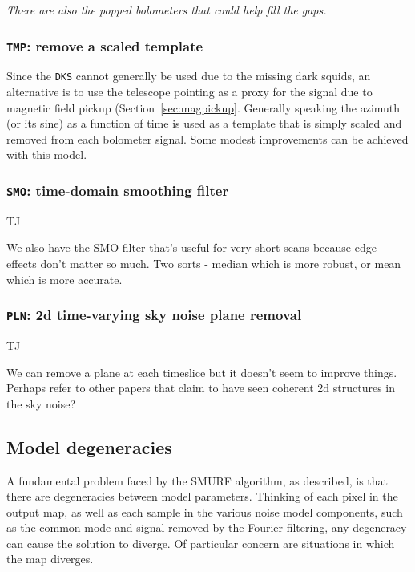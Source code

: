 \documentclass[useAMS,usenatbib,nofootinbib]{mn2e}
\begin{document}
\textit{There are also the popped bolometers that could help fill the
gaps.}

\subsubsection{\texttt{TMP}: remove a scaled template}

Since the \texttt{DKS} cannot generally be used due to the missing
dark squids, an alternative is to use the telescope pointing as a
proxy for the signal due to magnetic field pickup
(Section~\ref{sec:magpickup}. Generally speaking the azimuth (or its
sine) as a function of time is used as a template that is simply
scaled and removed from each bolometer signal. Some modest
improvements can be achieved with this model.

\subsubsection{\texttt{SMO}: time-domain smoothing filter}
\label{sec:smo}

TJ

We also have the SMO filter that's useful for very short scans
because edge effects don't matter so much. Two sorts - median which is
more robust, or mean which is more accurate.

\subsubsection{\texttt{PLN}: 2d time-varying sky noise plane removal}
\label{sec:pln}

TJ

We can remove a plane at each timeslice but it doesn't seem to improve
things. Perhaps refer to other papers that claim to have seen coherent
2d structures in the sky noise?

\subsection{Model degeneracies}

A fundamental problem faced by the SMURF algorithm, as described, is
that there are degeneracies between model parameters. Thinking of each
pixel in the output map, as well as each sample in the various noise
model components, such as the common-mode and signal removed by the
Fourier filtering, any degeneracy can cause the solution to
diverge. Of particular concern are situations in which the map
diverges.
\end{document}

